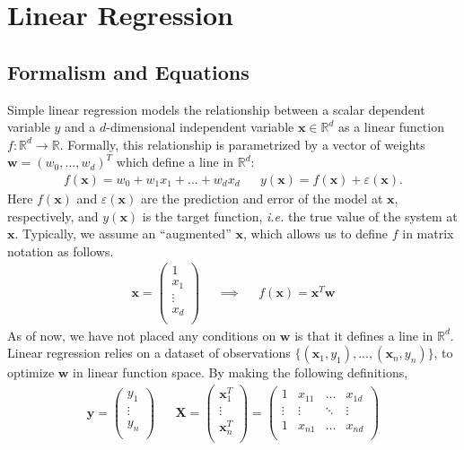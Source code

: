 \documentclass[11pt]{article}
\begin{document}
 

\section*{Linear Regression} 
\subsection*{Formalism and Equations}
Simple linear regression models the relationship between a scalar dependent
variable $y$ and a \mbox{$d$-dimensional} independent variable $\mathbf{x} \in
\mathbb{R}^d$ as a linear function $f: \mathbb{R}^d \rightarrow \mathbb{R}$.
Formally, this relationship is parametrized by a vector of weights
\mbox{$\mathbf{w} = (w_0, ... , w_d)^T$} which define a line in $\mathbb{R}^d$:
\begin{align}
	f(\mathbf{x}) 
= 
	w_0 + w_1 x_{1} + ...  + w_d x_{d} 
&& 
	y(\mathbf{x}) 
=
	f(\mathbf{x}) 
+ 
	\varepsilon(\mathbf{x}). 
\end{align} 
Here $f(\mathbf{x})$ and $\varepsilon(\mathbf{x})$ are the prediction and error
of the model at $\mathbf{x}$, respectively, and $y(\mathbf{x})$ is the target
function, \textit{i.e.} the true value of the system at $\mathbf{x}$.
Typically, we assume an ``augmented'' $\mathbf{x}$, which allows us to define
$f$ in matrix notation as follows.  
\begin{align} 
	\mathbf{x} 
= 
	\begin{pmatrix}
		1      \\ 
		x_1    \\
		\vdots \\ 
		x_d    \\ 
	\end{pmatrix} 
&& 
	\implies 
&& 
	f(\mathbf{x}) 
= 
	\mathbf{x}^T
	\mathbf{w} 
\end{align} 
As of now, we have not placed any conditions on $\mathbf{w}$ is that it defines
a line in $\mathbb{R}^d$.  
Linear regression relies on a dataset of observations $\{(\mathbf{x}_1, y_1),
... , (\mathbf{x}_n, y_n)\}$, to optimize $\mathbf{w}$ in linear function
space.  
By making the following definitions,
\begin{align} 
	\mathbf{y} 
=
	\begin{pmatrix}
		y_1    \\ 
		\vdots \\ 
		y_n    \\ 
	\end{pmatrix} 
&& 
	\mathbf{X} 
= 
	\begin{pmatrix}
		\mathbf{x}_1^T \\ 
		\vdots   	   \\ 
		\mathbf{x}_n^T \\ 
	\end{pmatrix} 
=
	\begin{pmatrix} 
		1 	    &  x_{11}  & \hdots & x_{1d} \\ 
		\vdots  &  \vdots  & \ddots & \vdots \\ 
		1 		&  x_{n1}  & \hdots & x_{nd} \\ 
	\end{pmatrix} 
\end{align} 
\end{document}

